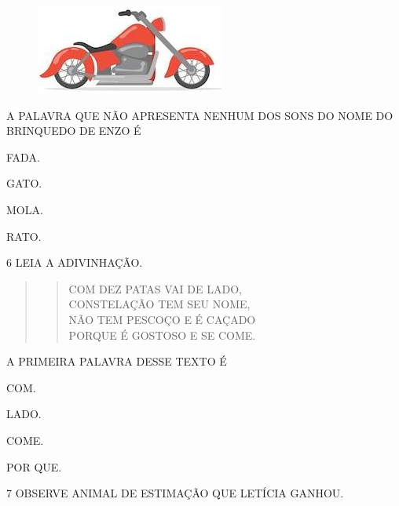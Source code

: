 \begin{figure}[htpb]
\centering
\includegraphics[width=.3\textwidth]{media/image245.jpg}
\end{figure}


A PALAVRA QUE NÃO APRESENTA NENHUM DOS SONS DO NOME DO BRINQUEDO DE ENZO É

\begin{escolha}
\item FADA.

\item GATO.

\item MOLA.

\item RATO.
\end{escolha}

\num{6} LEIA A ADIVINHAÇÃO. 

\begin{quote}
\begin{verse}
COM DEZ PATAS VAI DE LADO,\\
CONSTELAÇÃO TEM SEU NOME,\\
NÃO TEM PESCOÇO E É CAÇADO\\
PORQUE É GOSTOSO E SE COME.
\end{verse}

\end{quote}

A PRIMEIRA PALAVRA DESSE TEXTO É

\begin{escolha}
\item COM.

\item LADO.

\item COME.

\item POR QUE.
\end{escolha}

\pagebreak
\num{7} OBSERVE ANIMAL DE ESTIMAÇÃO QUE LETÍCIA GANHOU.

